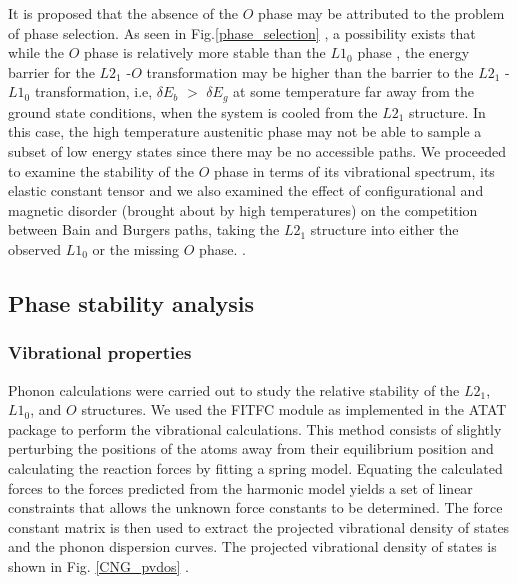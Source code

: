 \documentclass[%
preprint,
 amsmath,amssymb,
 aps,
prb,
showkeys,
]{revtex4-1}
\begin{document}
It is proposed that the absence of the $O$ phase may be attributed to the problem of phase selection. As seen in  Fig.\ref{phase_selection} ,  a possibility exists that while the $O$ phase is relatively more stable than the $L1_0$ phase , the energy barrier for the $L2_1$ -$O$ transformation may be higher than the barrier to the $L2_1$ -$L1_0$ transformation, i.e, $\delta E_b$ $>$  $\delta E_g$ at some temperature far away from the ground state conditions, when the system is cooled from the $L2_1$ structure. In this case, the high temperature austenitic phase  may not be able to sample a subset of low energy states since there may be no accessible paths. We proceeded to examine the stability of the $O$ phase in terms of its vibrational spectrum, its elastic constant tensor and we also examined the effect of configurational and magnetic disorder (brought about by high temperatures) on the competition between Bain and Burgers paths, taking the $L2_1$ structure into either the observed $L1_0$ or the missing $O$ 
phase.
.
\subsection{Phase stability analysis}

\subsubsection{Vibrational properties}
Phonon calculations were carried out to study the relative stability of the $L2_1$, $L1_0$, and $O$ structures. We used the FITFC module as implemented in the ATAT package to perform the vibrational calculations. This method consists of slightly perturbing the positions of the atoms away from their equilibrium position and calculating the reaction forces by fitting a spring model. Equating the calculated forces to the forces predicted from the harmonic model yields a set of linear constraints that allows the unknown force constants to be determined. The force constant matrix is then used to extract the projected vibrational density of states and the  phonon dispersion curves. The projected vibrational density of states is shown in Fig. \ref{CNG_pvdos} . 
\end{document}
